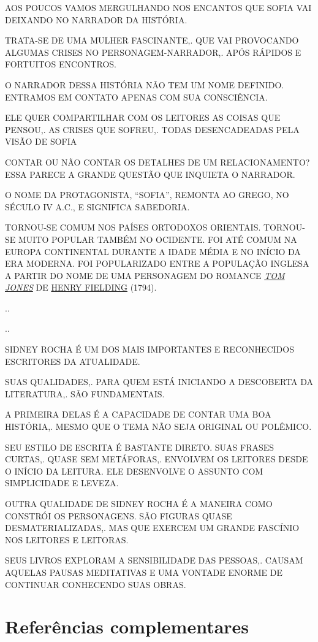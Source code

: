 \documentclass{extarticle}
\begin{document}
AOS POUCOS VAMOS MERGULHANDO NOS ENCANTOS QUE SOFIA VAI DEIXANDO NO
NARRADOR DA HISTÓRIA.
 
TRATA-SE DE UMA MULHER FASCINANTE,. QUE VAI PROVOCANDO ALGUMAS CRISES NO
PERSONAGEM-NARRADOR,. APÓS RÁPIDOS E FORTUITOS ENCONTROS.
 
O NARRADOR DESSA HISTÓRIA NÃO TEM UM NOME DEFINIDO. ENTRAMOS EM CONTATO
APENAS COM SUA CONSCIÊNCIA.
 
ELE QUER COMPARTILHAR COM OS LEITORES AS COISAS QUE PENSOU,. AS CRISES
QUE SOFREU,. TODAS DESENCADEADAS PELA VISÃO DE SOFIA
 
CONTAR OU NÃO CONTAR OS DETALHES DE UM RELACIONAMENTO? ESSA PARECE A
GRANDE QUESTÃO QUE INQUIETA O NARRADOR.

O NOME DA PROTAGONISTA, ``SOFIA'', REMONTA AO GREGO, NO SÉCULO IV A.C.,
E SIGNIFICA SABEDORIA.
 
TORNOU-SE COMUM NOS PAÍSES ORTODOXOS ORIENTAIS. TORNOU-SE MUITO POPULAR
TAMBÉM NO OCIDENTE. FOI ATÉ COMUM NA EUROPA CONTINENTAL DURANTE A IDADE
MÉDIA E NO INÍCIO DA ERA MODERNA. FOI POPULARIZADO ENTRE A POPULAÇÃO
INGLESA A PARTIR DO NOME DE UMA PERSONAGEM DO ROMANCE
\href{https://pt.wikipedia.org/wiki/The_History_of_Tom_Jones,_a_Foundling}{\emph{TOM
JONES}} DE \href{https://pt.wikipedia.org/wiki/Henry_Fielding}{HENRY
FIELDING} (1794).

..

..

SIDNEY ROCHA É UM DOS MAIS IMPORTANTES E RECONHECIDOS ESCRITORES DA
ATUALIDADE.
 
SUAS QUALIDADES,. PARA QUEM ESTÁ INICIANDO A DESCOBERTA DA LITERATURA,.
SÃO FUNDAMENTAIS.
 
A PRIMEIRA DELAS É A CAPACIDADE DE CONTAR UMA BOA HISTÓRIA,. MESMO QUE O
TEMA NÃO SEJA ORIGINAL OU POLÊMICO.
 
SEU ESTILO DE ESCRITA É BASTANTE DIRETO. SUAS FRASES CURTAS,. QUASE SEM
METÁFORAS,. ENVOLVEM OS LEITORES DESDE O INÍCIO DA LEITURA. ELE
DESENVOLVE O ASSUNTO COM SIMPLICIDADE E LEVEZA.
 
OUTRA QUALIDADE DE SIDNEY ROCHA É A MANEIRA COMO CONSTRÓI OS
PERSONAGENS. SÃO FIGURAS QUASE DESMATERIALIZADAS,. MAS QUE EXERCEM UM
GRANDE FASCÍNIO NOS LEITORES E LEITORAS.~
 
SEUS LIVROS EXPLORAM A SENSIBILIDADE DAS PESSOAS,. CAUSAM AQUELAS PAUSAS
MEDITATIVAS E UMA VONTADE ENORME DE CONTINUAR CONHECENDO SUAS OBRAS.

\section{Referências complementares}
\end{document}
